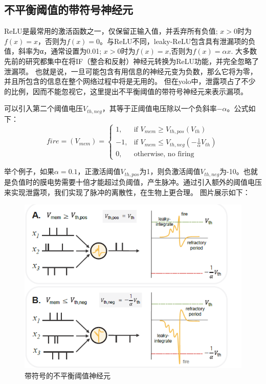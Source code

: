 \subsection{不平衡阈值的带符号神经元}
\par
ReLU是最常用的激活函数之一，仅保留正输入值，并丢弃所有负值; 
$x>0$时为$f(x)=x$，否则为$f(x) = 0$。与ReLU不同，leaky-ReLU包含具有泄漏项的负值，斜率为α，通常设置为0.01; 
$x>0$时为$f(x)=x$,否则为$f(x) = \alpha x$.
大多数先前的研究都集中在将IF（整合和反射）神经元转换为ReLU功能，并完全忽略了泄漏项。
也就是说，一旦可能包含有用信息的神经元变为负数，那么它将为零，并且所包含的信息在整个网络过程中将是无用的。
但在yolo中，泄露项占了不少的比例，因而不能忽视它，这里提出不平衡阈值的带符号神经元来表示漏项。
\par
可以引入第二个阈值电压$V_{th,neg}$，其等于正阈值电压除以一个负斜率$-\alpha$。公式如下：
\begin{equation}
	fire=(V_{mem}) = \begin{cases}
		1, & \text{if } V_{mem} \ge V_{th,pos}(V_{th}) \\
		-1, & \text{if } V_{mem} \le V_{th,neg}(-\frac{1}{\alpha}V_{th}) \\
		0, & \text{otherwise, no firing}
	\end{cases}
\end{equation}
\par
举个例子，如果$\alpha=0.1$，正激活阈值$V_{th,pos}$为1，则负激活阈值$V_{th,neg}$为-10。也就是负值时的膜电势需要十倍才能超过负阈值，产生脉冲。通过引入额外的阈值电压
来实现泄露项，我们实现了脉冲的离散性，在生物上更合理。
图片展示如下：
\begin{figure}[H]
	\centering
	\setlength{\abovecaptionskip}{0cm}  
	\includegraphics[scale=1]{figures/leakyrelu.png}
	\caption{带符号的不平衡阈值神经元}
\end{figure}
